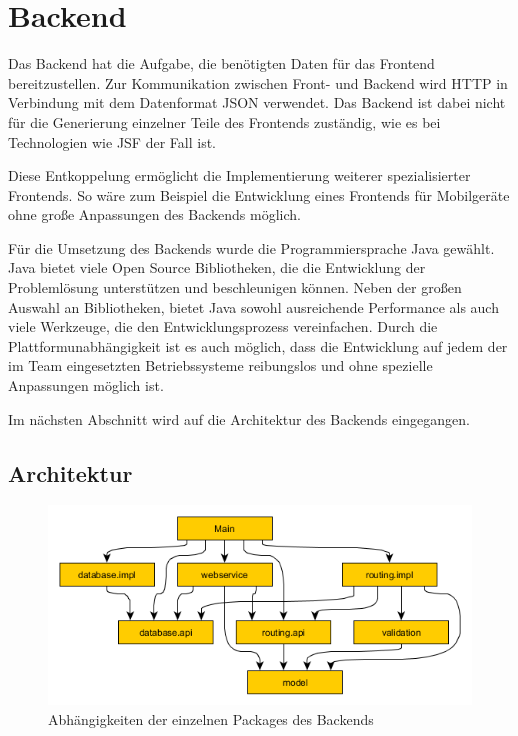 \documentclass[
ngerman          %
,a4paper          %
,11pt
,pdftex
]{report}
\begin{document}
\section{Backend}
Das Backend hat die Aufgabe, die benötigten Daten für das Frontend bereitzustellen. Zur Kommunikation zwischen Front- und Backend wird  \ac{HTTP} in Verbindung mit dem Datenformat \ac{JSON} verwendet. Das Backend ist dabei nicht für die Generierung einzelner Teile des Frontends zuständig, wie es bei Technologien wie \ac{JSF} der Fall ist.

Diese Entkoppelung ermöglicht die Implementierung weiterer spezialisierter Frontends. So wäre zum Beispiel die Entwicklung eines Frontends für Mobilgeräte ohne große Anpassungen des Backends möglich.

Für die Umsetzung des Backends wurde die Programmiersprache Java gewählt. Java bietet viele Open Source Bibliotheken, die die Entwicklung der Problemlösung unterstützen und beschleunigen können. Neben der großen Auswahl an Bibliotheken, bietet Java sowohl ausreichende Performance als auch viele Werkzeuge, die den Entwicklungsprozess vereinfachen. Durch die Plattformunabhängigkeit ist es auch möglich, dass die Entwicklung auf jedem der im Team eingesetzten Betriebssysteme reibungslos und ohne spezielle Anpassungen möglich ist.

Im nächsten Abschnitt wird auf die Architektur des Backends eingegangen.

\subsection{Architektur}

\begin{figure}
\centering
\includegraphics[width=1\linewidth]{architecture.png}
\caption{Abhängigkeiten der einzelnen Packages des Backends}
\label{fig:arch}
\end{figure}
\end{document}
